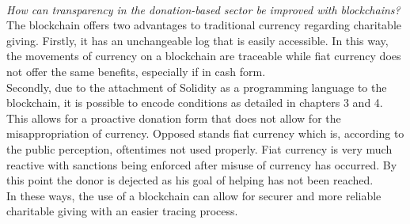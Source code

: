\\
\emph{How can transparency in the donation-based sector be improved with blockchains?}\\
The blockchain offers two advantages to traditional currency regarding charitable giving. Firstly, it has an unchangeable log that is easily accessible. In this way, the movements of currency on a blockchain are traceable while fiat currency does not offer the same benefits, especially if in cash form.\\
Secondly, due to the attachment of Solidity as a programming language to the blockchain, it is possible to encode conditions as detailed in chapters 3 and 4. This allows for a proactive donation form that does not allow for the misappropriation of currency. Opposed stands fiat currency which is, according to the public perception, oftentimes not used properly\cite{giving19}\cite{trustgov}. Fiat currency is very much reactive with sanctions being enforced after misuse of currency has occurred. By this point the donor is dejected as his goal of helping has not been reached.\\
In these ways, the use of a blockchain can allow for securer and more reliable charitable giving with an easier tracing process.
